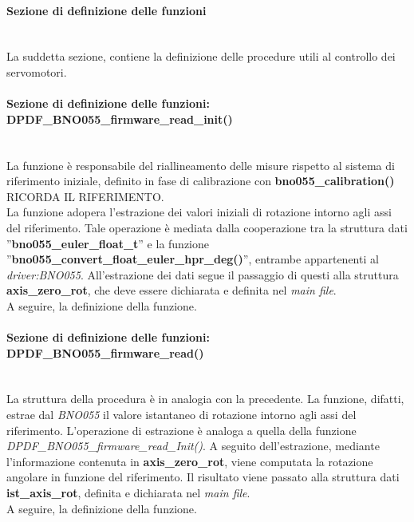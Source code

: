 \paragraph{Sezione di definizione delle funzioni}\mbox{}\\
La suddetta sezione, contiene la definizione delle procedure utili al controllo dei servomotori.

\paragraph{Sezione di definizione delle funzioni: DPDF\_BNO055\_firmware\_read\_init()}\mbox{}\\
La funzione è responsabile del riallineamento delle misure rispetto al sistema di riferimento iniziale, definito in fase di calibrazione con \textbf{bno055\_calibration()} RICORDA IL RIFERIMENTO.\\
La funzione adopera l'estrazione dei valori iniziali di rotazione intorno agli assi del riferimento. Tale operazione è mediata dalla cooperazione tra la struttura dati ''\textbf{bno055\_euler\_float\_t}'' e la funzione ''\textbf{bno055\_convert\_float\_euler\_hpr\_deg()}'', entrambe appartenenti al \textit{driver:BNO055}.
All'estrazione dei dati segue il passaggio di questi alla struttura \textbf{axis\_zero\_rot}, che deve essere dichiarata e definita nel \textit{main file}.\\
A seguire, la definizione della funzione.\\


\paragraph{Sezione di definizione delle funzioni: DPDF\_BNO055\_firmware\_read()}\mbox{}\\
La struttura della procedura è in analogia con la precedente. La funzione, difatti, estrae dal \textit{BNO055} il valore istantaneo di rotazione intorno agli assi del riferimento. L'operazione di estrazione è analoga a quella della funzione \textit{DPDF\_BNO055\_firmware\_read\_Init()}.
A seguito dell'estrazione, mediante l'informazione contenuta in \textbf{axis\_zero\_rot}, viene computata la rotazione angolare in funzione del riferimento. Il risultato viene passato alla struttura dati \textbf{ist\_axis\_rot}, definita e dichiarata nel \textit{main file}.\\
A seguire, la definizione della funzione.\\


